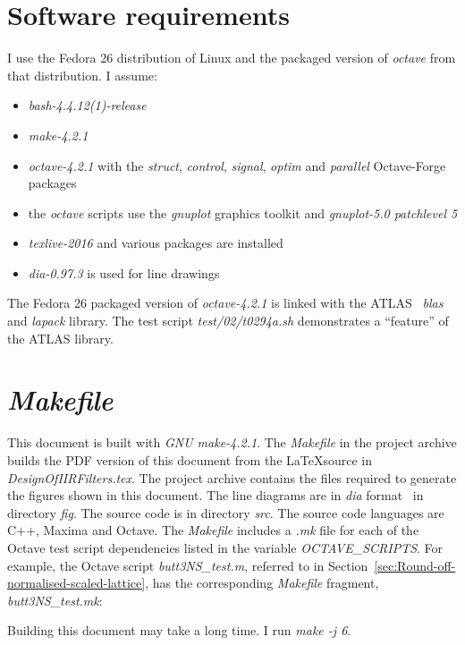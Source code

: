 \documentclass[a4paper,twoside,10pt,english]{report}
\begin{document}
\section*{Software requirements}
I use the Fedora 26 distribution of Linux and the packaged version of
\emph{octave} from that distribution. I assume:
\begin{itemize}
\item \emph{bash-4.4.12(1)-release}
\item \emph{make-4.2.1}
\item \emph{octave-4.2.1} with the \emph{struct}, \emph{control},
  \emph{signal}, \emph{optim} and \emph{parallel} Octave-Forge packages
\item the \emph{octave} scripts use the \emph{gnuplot} graphics toolkit and
  \emph{gnuplot-5.0 patchlevel 5}
\item \emph{texlive-2016} and various packages are installed
\item \emph{dia-0.97.3} is used for line drawings
\end{itemize}
The Fedora 26 packaged version of \emph{octave-4.2.1} is linked with the
ATLAS~\cite{ATLAS_website} \emph{blas} and \emph{lapack} library. The test
script \emph{test/02/t0294a.sh} demonstrates a ``feature'' of the ATLAS
library.

\section*{\emph{Makefile}}
This document is built with \emph{GNU make-4.2.1}. The \emph{Makefile} in the
project archive builds the PDF version of this document from the \LaTeX source
in \emph{DesignOfIIRFilters.tex}. The project archive contains the files
required to generate the figures shown in this document. The line diagrams are
in \emph{dia} format~\cite{Dia_DiagramEditor} in directory \emph{fig}.  The
source code is in directory \emph{src}.  The source code languages are C++,
Maxima and Octave. The \emph{Makefile} includes a \emph{.mk} file for each of
the Octave test script dependencies listed in the variable
\emph{OCTAVE\_SCRIPTS}. For example, the Octave script \emph{butt3NS\_test.m},
referred to in Section~\ref{sec:Round-off-normalised-scaled-lattice}, has the
corresponding \emph{Makefile} fragment, \emph{butt3NS\_test.mk}:
\begin{small}

\end{small}
Building this document may take a long time. I run \emph{make -j 6}.
\end{document}
